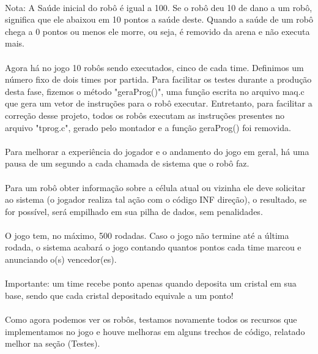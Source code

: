 \documentclass[a4paper]{article}
\begin{document}
  \paragraph{}
  Nota: A Saúde inicial do robô é igual a 100. Se o robô deu 10 de dano a um robô, significa que ele abaixou em 10 pontos a saúde deste. Quando a saúde de um robô chega a 0 pontos ou menos ele morre, ou seja, é removido da arena e não executa mais.
  \paragraph{}
  Agora há no jogo 10 robôs sendo executados, cinco de cada time. Definimos um número fixo de dois times por partida. Para facilitar os testes durante a produção desta fase, fizemos o método "geraProg()", uma função escrita no arquivo maq.c que gera um vetor de instruções para o robô executar. Entretanto, para facilitar a correção desse projeto, todos os robôs executam as instruções presentes no arquivo "tprog.c", gerado pelo montador e a função geraProg() foi removida.
  \paragraph{}
  Para melhorar a experiência do jogador e o andamento do jogo em geral, há uma pausa de um segundo a cada chamada de sistema que o robô faz.
  \paragraph{}
  Para um robô obter informação sobre a célula atual ou vizinha ele deve solicitar ao sistema (o jogador realiza tal ação com o código INF direção), o resultado, se for possível, será empilhado em sua pilha de dados, sem penalidades.
  \paragraph{}
  O jogo tem, no máximo, 500 rodadas. Caso o jogo não termine até a última rodada, o sistema acabará o jogo contando quantos pontos cada time marcou e anunciando o(s) vencedor(es).
  \paragraph{}
  Importante: um time recebe ponto apenas quando deposita um cristal em sua base, sendo que cada cristal depositado equivale a um ponto! 
  \paragraph{}
  Como agora podemos ver os robôs, testamos novamente todos os recursos que implementamos no jogo e houve melhoras em alguns trechos de código, relatado melhor na seção (Testes).
 
\end{document}
